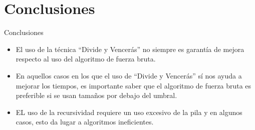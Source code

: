 \documentclass[10pt, xcolor=table]{beamer}
\begin{document}
\section{Conclusiones}

\begin{frame}[fragile]{Conclusiones}

	\begin{itemize}
	\item El uso de la técnica ``Divide y Vencerás'' no siempre es garantía de mejora respecto al uso del algoritmo de fuerza bruta.
	
	\item En aquellos casos en los que el uso de ``Divide y Vencerás'' sí nos ayuda a mejorar los tiempos, es importante saber que el algoritmo de fuerza bruta es preferible si se usan tamaños por debajo del umbral.
	
	\item EL uso de la recursividad requiere un uso excesivo de la pila y en algunos casos, esto da lugar a algoritmos ineficientes.
	
		
\end{itemize}		
\end{frame}
\end{document}
